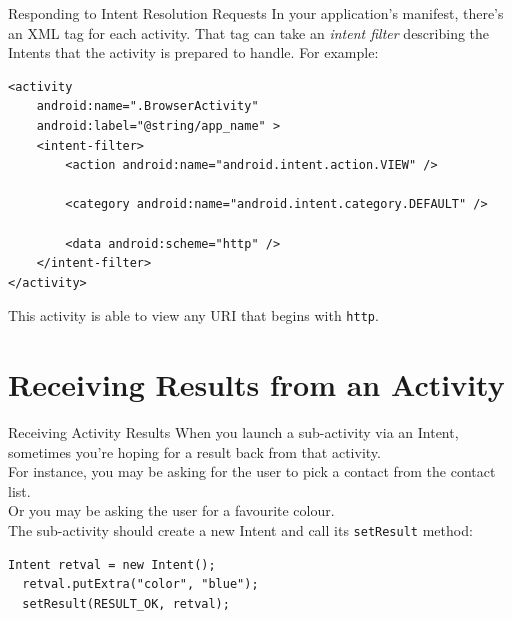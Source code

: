 \documentclass[aspectratio=169]{beamer}
\begin{document}
\begin{frame}[fragile]{Responding to Intent Resolution Requests}
In your application's manifest, there's an XML tag for each activity.
That tag can take an \emph{intent filter} describing the Intents
that the activity is prepared to handle. For example: \\
\vspace{0.5em}
{\scriptsize 
\begin{verbatim}
<activity
    android:name=".BrowserActivity"
    android:label="@string/app_name" >
    <intent-filter>
        <action android:name="android.intent.action.VIEW" />

        <category android:name="android.intent.category.DEFAULT" />

        <data android:scheme="http" />
    </intent-filter>
</activity>
\end{verbatim}
}
\vspace{0.5em}
This activity is able to view any URI that begins with {\tt http}.
\end{frame}



\section*{Receiving Results from an Activity}



\begin{frame}[fragile]{Receiving Activity Results}
When you launch a sub-activity via an Intent, sometimes you're hoping for a result
back from that activity. \\
\vspace{0.5em}
For instance, you may be asking for the
user to pick a contact from the contact list. \\
\vspace{0.5em}
Or you may be asking the
user for a favourite colour. \\
\vspace{0.5em}
The sub-activity should
create a new Intent and call its {\tt setResult} method: \\
\vspace{0.5em}
\begin{Verbatim}[fontsize=\normalsize]
  Intent retval = new Intent();
  retval.putExtra("color", "blue");
  setResult(RESULT_OK, retval);
\end{Verbatim}
\end{frame}
\end{document}
